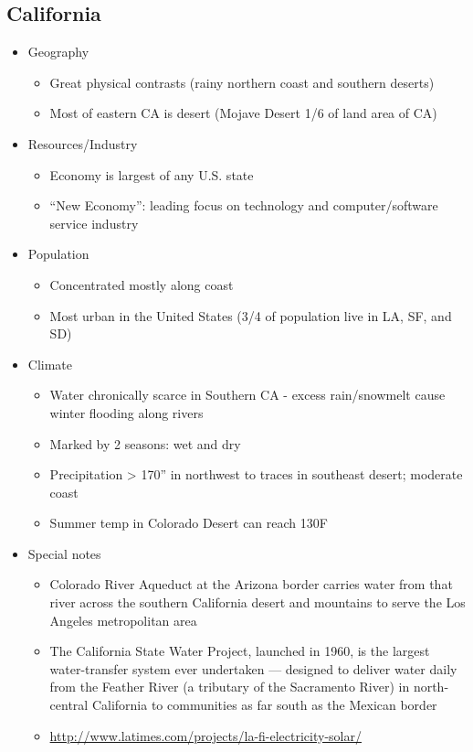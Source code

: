 \documentclass[9pt,twocolumn,twoside]{pnas-new}
\begin{document}
\subsection*{California}

\begin{itemize}
\item Geography
\begin{itemize}
\item Great physical contrasts (rainy northern coast and southern deserts)
\item Most of eastern CA is desert (Mojave Desert 1/6 of land area of CA)
\end{itemize}

\item Resources/Industry
\begin{itemize}
\item Economy is largest of any U.S. state
\item “New Economy”: leading focus on technology and computer/software service industry
\end{itemize}

\item Population
\begin{itemize}
\item Concentrated mostly along coast
\item Most urban in the United States (3/4 of population live in LA, SF, and SD)
\end{itemize}

\item Climate
\begin{itemize}
\item Water chronically scarce in Southern CA - excess rain/snowmelt cause winter flooding along rivers
\item Marked by 2 seasons: wet and dry
\item Precipitation > 170” in northwest to traces in southeast desert; moderate coast
\item Summer temp in Colorado Desert can reach 130F
\end{itemize}

\item Special notes
\begin{itemize}
\item Colorado River Aqueduct at the Arizona border carries water from that river across the southern California desert and mountains to serve the Los Angeles metropolitan area
\item The California State Water Project, launched in 1960, is the largest water-transfer system ever undertaken — designed to deliver water daily from the Feather River (a tributary of the Sacramento River) in north-central California to communities as far south as the Mexican border
\item  \url{http://www.latimes.com/projects/la-fi-electricity-solar/ }
\end{itemize}
\end{itemize}
\end{document}
